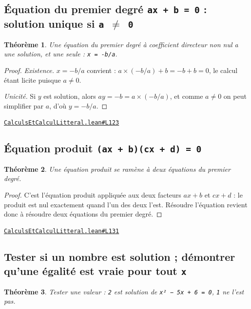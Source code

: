 \documentclass[11pt,a4paper]{article}
\theoremstyle{definition}
\theoremstyle{plain}
\newtheorem{theoreme}{Théorème}
\newcommand{\source}[2]{\par\smallskip\noindent\hfill{\footnotesize\href{#1}{\texttt{#2}}}\par\smallskip}
\begin{document}
\subsection{Équation du premier degré \texttt{ax + b = 0} : solution unique si \texttt{a \(\ne\) 0}}

\begin{theoreme}
Une équation du premier degré à coefficient directeur non nul a une solution, et une
seule : \texttt{x = -b/a}.
\end{theoreme}

\begin{proof}
\emph{Existence.} $x = -b/a$ convient : $a \times (-b/a) + b = -b + b = 0$, le calcul
étant licite puisque $a \ne 0$.

\emph{Unicité.} Si $y$ est solution, alors $ay = -b = a \times (-b/a)$, et comme $a \ne 0$
on peut simplifier par $a$, d'où $y = -b/a$.
\end{proof}
\source{https://github.com/Commutator-IO/learn-lean/blob/main/cours/01-college/01-nombres-et-calculs/CalculsEtCalculLitteral.lean\#L123}{CalculsEtCalculLitteral.lean\#L123}

\subsection{Équation produit \texttt{(ax + b)(cx + d) = 0}}

\begin{theoreme}
Une équation produit se ramène à deux équations du premier degré.
\end{theoreme}

\begin{proof}
C'est l'équation produit appliquée aux deux facteurs $ax + b$ et $cx + d$ : le
produit est nul exactement quand l'un des deux l'est. Résoudre l'équation revient donc à
résoudre deux équations du premier degré.
\end{proof}
\source{https://github.com/Commutator-IO/learn-lean/blob/main/cours/01-college/01-nombres-et-calculs/CalculsEtCalculLitteral.lean\#L131}{CalculsEtCalculLitteral.lean\#L131}

\subsection{Tester si un nombre est solution ; démontrer qu'une égalité est vraie pour tout \texttt{x}}

\begin{theoreme}
Tester une valeur : \texttt{2} est solution de \texttt{x² − 5x + 6 = 0}, \texttt{1} ne l'est pas.
\end{theoreme}
\end{document}
